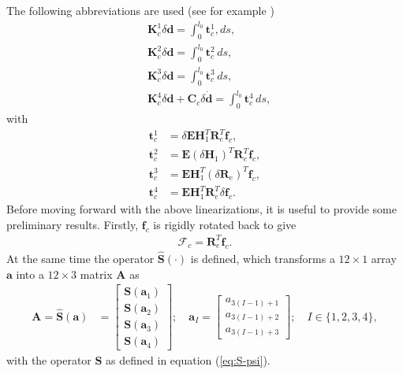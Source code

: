 \documentclass[3p]{elsarticle}
\newcommand{\vect}[1]{\boldsymbol{#1}}
\begin{document}
 The following abbreviations are used (see for example \cite{Meier2017a})
\begin{subequations}
	\begin{align}
		&\vect{K}_c^1\delta\vect{d}=\int_0^{l_0}\vect{t}_c^1,ds,\label{eq:Kc1}\\
		&\vect{K}_c^2\delta\vect{d}=\int_0^{l_0}\vect{t}_c^2\,ds,\label{eq:Kc2}\\
		&\vect{K}_c^3\delta\vect{d}=\int_0^{l_0}\vect{t}_c^3\,ds,\label{eq:Kc3}\\
		&\vect{K}_c^4\delta\vect{d}+\vect{C}_c\delta\dot{\vect{d}}=\int_0^{l_0}\vect{t}_c^4\,ds,\label{eq:Kc4}
	\end{align}\label{eq:Kci}
\end{subequations}
\noindent with
\begin{subequations}
	\begin{align}
		\vect{t}_c^1&=\delta\vect{E}\vect{H}^T_1\vect{R}_e^T\vect{f}_c,\\
		\vect{t}_c^2&=\vect{E}(\delta\vect{H}_1)^T\vect{R}_e^T\vect{f}_c,\\
		\vect{t}_c^3&=\vect{E}\vect{H}_1^T(\delta\vect{R}_e)^T\vect{f}_c,\\
		\vect{t}_c^4&=\vect{E}\vect{H}_1^T\vect{R}_e^T\delta\vect{f}_c.
	\end{align}\label{eq:tci-intro}
\end{subequations}
\noindent Before moving forward with the above linearizations, it is useful to provide some preliminary results. Firstly, $\vect{f}_c$ is rigidly rotated back to give
\begin{align}
	\vect{\mathcal{F}}_c = \vect{R}_e^T\vect{f}_c\label{eq:Fc}.
\end{align}
\noindent At the same time the operator $\hat{\vect{S}}(\cdot)$ is defined, which transforms a $12\times 1$ array $\vect{a}$ into a $12\times 3$ matrix $\vect{A}$ as
\begin{align}
	\vect{A}=\hat{\vect{S}}(\vect{a}) &= \left[\begin{array}{c}
		\vect{S}(\vect{a}_1)\\\vect{S}(\vect{a}_2)\\\vect{S}(\vect{a}_3)\\\vect{S}(\vect{a}_4 )
	\end{array}\right];\quad \vect{a}_I = \left[\begin{array}{c}
		a_{3(I-1)+1}\\a_{3(I-1)+2}\\a_{3(I-1)+3}
	\end{array}\right];\quad I \in \{1,2,3,4\},\label{eq:Shat}
\end{align}
\noindent with the operator $\vect{S}$ as defined in equation (\ref{eq:S-psi}). 
\end{document}
